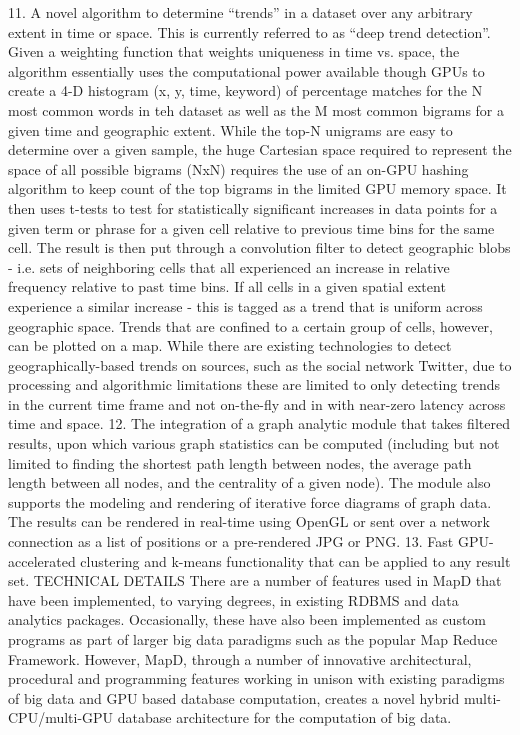 \documentclass[twocolumn]{article}
\begin{document}
11. A novel algorithm to determine “trends” in a dataset over any arbitrary extent in time or space. This is currently referred to as “deep trend detection”. Given a weighting function that weights uniqueness in time vs. space, the algorithm essentially uses the computational power available though GPUs to create a 4-D histogram (x, y, time, keyword) of percentage matches for the N most common words in teh dataset as well as the M most common bigrams for a given time and geographic extent. While the top-N unigrams are easy to determine over a given sample, the huge Cartesian space required to represent the space of all possible bigrams (NxN) requires the use of an on-GPU hashing algorithm to keep count of the top bigrams in the limited GPU memory space. It then uses t-tests to test for statistically significant increases in data points for a given term or phrase for a given cell relative to previous time bins for the same cell. The result is then put through a convolution filter to detect geographic blobs - i.e. sets of neighboring cells that all experienced an increase in relative frequency relative to past time bins. If all cells in a given spatial extent experience a similar increase - this is tagged as a trend that is uniform across geographic space. Trends that are confined to a certain group of cells, however, can be plotted on a map. While there are existing technologies to detect geographically-based trends on sources, such as the social network Twitter, due to processing and algorithmic limitations these are limited to only detecting trends in the current time frame and not on-the-fly and in with near-zero latency across time and space.
12. The integration of a graph analytic module that takes filtered results, upon which various graph statistics can be computed (including but not limited to finding the shortest path length between nodes, the average path length between all nodes, and the centrality of a given node). The module also supports the modeling and rendering of iterative force diagrams of graph data. The results can be rendered in real-time using OpenGL or sent over a network connection as a list of positions or a pre-rendered JPG or PNG.
13. Fast GPU-accelerated clustering and k-means functionality that can be applied to any result set.
TECHNICAL DETAILS
There are a number of features used in MapD that have been implemented, to varying degrees, in existing RDBMS and data analytics packages. Occasionally, these have also been implemented as custom programs as part of larger big data paradigms such as the popular Map Reduce Framework. However, MapD, through a number of innovative architectural, procedural and programming features working in unison with existing paradigms of big data and GPU based database computation, creates a novel hybrid multi-CPU/multi-GPU database architecture for the computation of big data.
\end{document}
